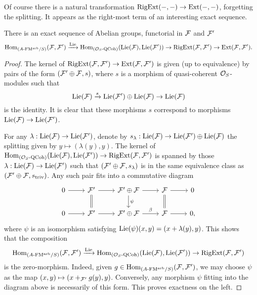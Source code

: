 \documentclass[../main.tex]{subfiles}
\begin{document}
Of course there is a natural transformation $\operatorname {RigExt}(-,-) \to \operatorname{Ext}(-,-)$,
forgetting the splitting. It appears as the right-most
term of an interesting exact sequence.
\begin{prop}%
  There is an exact sequence of Abelian groups, functorial in
  $\mathcal{F}$ and $\mathcal{F}'$
  \begin{equation*}
    \operatorname{Hom}_{{({A}\textnormal-\allowbreak\mathrm{FM^{arb}}/{S})}}(\mathcal{F}, \mathcal{F}') \xrightarrow{\operatorname{Lie}} \operatorname{Hom}_{{({\mathcal{O}_S}\textnormal-\allowbreak\mathrm{QCoh})}}(\operatorname{Lie}(\mathcal{F}), \operatorname{Lie}(\mathcal{F}'))
    \to \operatorname {RigExt}(\mathcal{F}, \mathcal{F}') \to \operatorname{Ext}(\mathcal{F}, \mathcal{F}'). 
  \end{equation*}
\begin{proof}
  The kernel of $\operatorname {RigExt}(\mathcal{F},\mathcal{F}') \to \operatorname{Ext}(\mathcal{F},\mathcal{F}')$ is given (up to
  equivalence) by 
  pairs of the form $(\mathcal{F}' \oplus \mathcal{F}, s)$, where $s$ is a morphism
  of quasi-coherent $\mathcal{O}_S$-modules such that 
  $$ \operatorname{Lie}(\mathcal{F}) \xrightarrow{s} \operatorname{Lie}(\mathcal{F}') \oplus \operatorname{Lie}(\mathcal{F}) \to  \operatorname{Lie}(\mathcal{F})$$
  is the identity. It is clear that these morphisms $s$ correspond to morphisms 
  $\operatorname{Lie}(\mathcal{F}) \to \operatorname{Lie}(\mathcal{F}')$. 

  For any $\lambda: \operatorname{Lie}(\mathcal{F}) \to \operatorname{Lie}(\mathcal{F}')$, denote by $s_\lambda : 
  \operatorname{Lie}(\mathcal{F}) \to \operatorname{Lie}(\mathcal{F}') \oplus \operatorname{Lie}(\mathcal{F})$ the splitting given by 
  $y \mapsto (\lambda(y) , y)$.
  The kernel of $\operatorname{Hom}_{{({\mathcal{O}_S}\textnormal-\allowbreak\mathrm{QCoh})}}(\operatorname{Lie}(\mathcal{F}), \operatorname{Lie}(\mathcal{F}')) \to \operatorname {RigExt}(\mathcal{F},
  \mathcal{F}')$ is spanned by those $\lambda: \operatorname{Lie}(\mathcal{F}) \to \operatorname{Lie}(\mathcal{F}')$ such that 
  $(\mathcal{F}' \oplus \mathcal{F}, s_\lambda)$ is in the same equivalence
  class as $(\mathcal{F}' \oplus \mathcal{F}, s_{\mathrm{triv}})$. Any such pair fits into
  a commutative diagram 
  \begin{equation*}
    \begin{tikzcd}[ampersand replacement=\&]
    	0 \& {\cF'} \& {\cF' \oplus \cF} \& \cF \& 0 \\
    	0 \& {\cF'} \& {\cF' \oplus \cF} \& \cF \& 0,
    	\arrow[from=1-1, to=1-2]
    	\arrow[from=1-2, to=1-3]
    	\arrow[Rightarrow, no head, from=1-2, to=2-2]
    	\arrow[from=1-3, to=1-4]
    	\arrow["\psi", from=1-3, to=2-3]
    	\arrow[from=1-4, to=1-5]
    	\arrow[Rightarrow, no head, from=1-4, to=2-4]
    	\arrow[from=2-1, to=2-2]
    	\arrow[ from=2-2, to=2-3]
    	\arrow["\beta", from=2-3, to=2-4]
    	\arrow[from=2-4, to=2-5]
    \end{tikzcd}
  \end{equation*}
  where $\psi$ is an isomorphism satisfying $\operatorname{Lie}(\psi)(x,y) = (x + \lambda(y), y)$.
  This shows that the composition 
  \begin{equation*}
    \operatorname{Hom}_{{({A}\textnormal-\allowbreak\mathrm{FM^{arb}}/{S})}}(\mathcal{F}, \mathcal{F}') \xrightarrow{\operatorname{Lie}} \operatorname{Hom}_{{({\mathcal{O}_S}\textnormal-\allowbreak\mathrm{QCoh})}}(\operatorname{Lie}(\mathcal{F}),
    \operatorname{Lie}(\mathcal{F}')) \to \operatorname {RigExt}(\mathcal{F}, \mathcal{F}')
  \end{equation*}
  is the zero-morphism. Indeed, given $g \in  \operatorname{Hom}_{{({A}\textnormal-\allowbreak\mathrm{FM^{arb}}/{S})}}(\mathcal{F}, \mathcal{F}')$,
  we may choose $\psi$ as the map $(x, y) \mapsto (x +_{\mathcal{F}'} g(y), y)$.
  Conversely, any morphism $\psi$ fitting into the diagram above is necessarily
  of this form. This proves exactness on the left.
\end{proof}
\end{prop}

\end{document}
